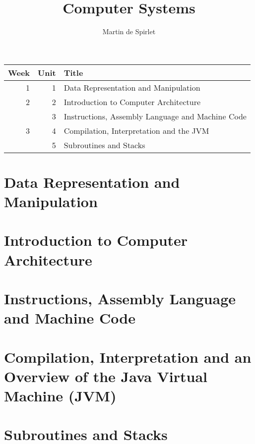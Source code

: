 \documentclass[
  11pt,
  a4paper,
]{article}
\title{Computer Systems}
\author{Martin de Spirlet}
\date{}
\begin{document}

\maketitle

\vspace*{\fill}

\begin{table}[htp]
  \centering
  \begin{tabular}{rrl}
    \toprule
    Week & Unit & Title \\
    \midrule
     1 &  1 & Data Representation and Manipulation \\[1ex]
     2 &  2 & Introduction to Computer Architecture \\
       &  3 & Instructions, Assembly Language and Machine Code \\[1ex]
     3 &  4 & Compilation, Interpretation and the JVM \\
       &  5 & Subroutines and Stacks \\
    \bottomrule
  \end{tabular}
\end{table}

\vspace*{\fill}
\addvspace{1in}

\clearpage


\section{Data Representation and Manipulation}


\section{Introduction to Computer Architecture}


\section{Instructions, Assembly Language and Machine Code}


\section[Compilation, Interpretation and the JVM]{Compilation, Interpretation and an Overview of the Java Virtual Machine (JVM)}


\section{Subroutines and Stacks}

\end{document}
